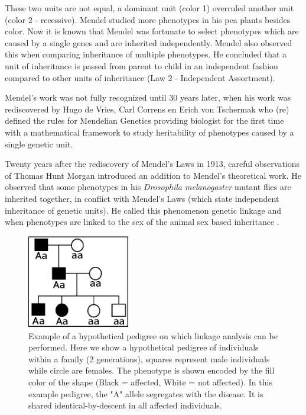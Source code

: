 These two units are not equal, a dominant unit (color 1) overruled another 
unit (color 2 - recessive). Mendel studied more phenotypes in his pea plants 
besides color. Now it is known that Mendel was fortunate to select 
phenotypes which are caused by a single genes and are inherited independently. 
Mendel also observed this when comparing inheritance of multiple phenotypes. 
He concluded that a unit of inheritance is passed from parent to child in an 
independent fashion compared to other units of inheritance 
(Law 2 - Independent Assortment).

Mendel's work was not fully recognized until 30 years later, when his work was 
rediscovered by Hugo de Vries, Carl Correns en Erich von Tschermak who (re) defined the 
rules for Mendelian Genetics \cite{deVries:1889} providing biologist for the first 
time with a mathematical framework to study heritability of phenotypes caused by a 
single genetic unit.

Twenty years after the rediscovery of Mendel's Laws in 1913, careful observations of 
Thomas Hunt Morgan introduced an addition to Mendel's theoretical work. He observed 
that some phenotypes in his \emph{Drosophila melanogaster} mutant flies are inherited 
together, in conflict with Mendel's Laws (which state independent inheritance of 
genetic units). He called this phenomenon genetic linkage and when phenotypes are 
linked to the sex of the animal sex based inheritance \cite{Morgan:1915, Morgan:1916}.

\begin{figure}
  \centering
  \includegraphics[width=0.4\textwidth]{eps/image_1_2.eps}
  \caption[Example of pedigree based linkage analysis.]
    {Example of a hypothetical pedigree on which linkage analysis can be performed. Here we show a 
    hypothetical pedigree of individuals within a family (2 generations), squares represent 
    male individuals while circle are females. The phenotype is shown encoded by the fill 
    color of the shape (Black = affected, White = not affected).  In this example pedigree, 
    the "A" allele segregates with the disease. It is shared identical-by-descent in all 
    affected individuals. }
    \label{fig:pedigree}
\end{figure}

